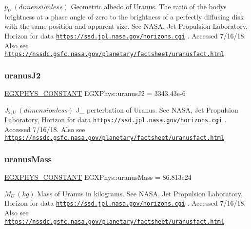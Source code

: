 $ p_{U} \ (dimensionless)$ Geometric albedo of Uranus. The ratio of the body\textquotesingle{}s brightness at a phase angle of zero to the brightness of a perfectly diffusing disk with the same position and apparent size. See N\+A\+SA, Jet Propulsion Laboratory, Horizon for data \href{https://ssd.jpl.nasa.gov/horizons.cgi}{\tt https\+://ssd.\+jpl.\+nasa.\+gov/horizons.\+cgi} . Accessed 7/16/18. Also see \href{https://nssdc.gsfc.nasa.gov/planetary/factsheet/uranusfact.html}{\tt https\+://nssdc.\+gsfc.\+nasa.\+gov/planetary/factsheet/uranusfact.\+html} \mbox{\label{group___e_g_x_phys-_constants-_astrophysics-_solar_system-_uranus-_bulk_ga2b1d23bfe148337be5275b1abd51f97a}} 
\subsubsection{\texorpdfstring{uranus\+J2}{uranusJ2}}
{\footnotesize\ttfamily \mbox{\hyperlink{group___e_g_x_phys-_constants-_macros_ga76980d288494ce1714c9ac68a95ba702}{E\+G\+X\+P\+H\+Y\+S\+\_\+\+C\+O\+N\+S\+T\+A\+NT}} E\+G\+X\+Phys\+::uranus\+J2 = 3343.\+43e-\/6}

$ J_{2,U} \ (dimensionless)$ J\+\_ perterbation of Uranus. See N\+A\+SA, Jet Propulsion Laboratory, Horizon for data \href{https://ssd.jpl.nasa.gov/horizons.cgi}{\tt https\+://ssd.\+jpl.\+nasa.\+gov/horizons.\+cgi} . Accessed 7/16/18. Also see \href{https://nssdc.gsfc.nasa.gov/planetary/factsheet/uranusfact.html}{\tt https\+://nssdc.\+gsfc.\+nasa.\+gov/planetary/factsheet/uranusfact.\+html} \mbox{\label{group___e_g_x_phys-_constants-_astrophysics-_solar_system-_uranus-_bulk_gaccabd738d57e4f5b6dc7b88d67b2cace}} 
\subsubsection{\texorpdfstring{uranus\+Mass}{uranusMass}}
{\footnotesize\ttfamily \mbox{\hyperlink{group___e_g_x_phys-_constants-_macros_ga76980d288494ce1714c9ac68a95ba702}{E\+G\+X\+P\+H\+Y\+S\+\_\+\+C\+O\+N\+S\+T\+A\+NT}} E\+G\+X\+Phys\+::uranus\+Mass = 86.\+813e24}

$M_{U} \ (kg)$ Mass of Uranus in kilograms. See N\+A\+SA, Jet Propulsion Laboratory, Horizon for data \href{https://ssd.jpl.nasa.gov/horizons.cgi}{\tt https\+://ssd.\+jpl.\+nasa.\+gov/horizons.\+cgi} . Accessed 7/16/18. Also see \href{https://nssdc.gsfc.nasa.gov/planetary/factsheet/uranusfact.html}{\tt https\+://nssdc.\+gsfc.\+nasa.\+gov/planetary/factsheet/uranusfact.\+html} \mbox{\label{group___e_g_x_phys-_constants-_astrophysics-_solar_system-_uranus-_bulk_ga26cda1990ca0ac98e925a80c26ee88f5}} 
